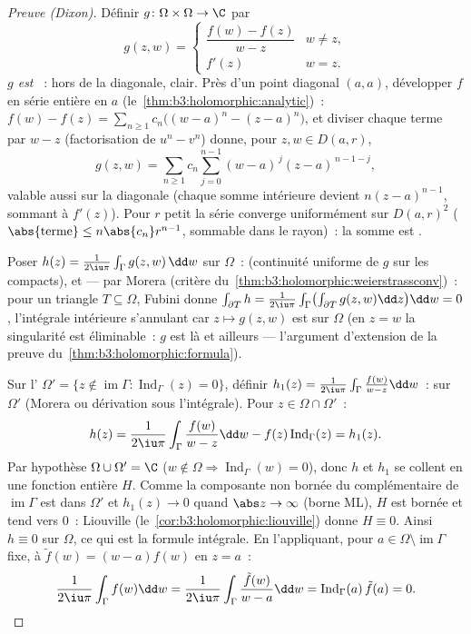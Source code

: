 \begin{proof}[Preuve (Dixon)]
Définir $g \colon \Omega\times\Omega \to \C$ par
\[
g(z, w) = \begin{cases}
\dfrac{f(w) - f(z)}{w - z} & w \neq z,\\[4pt]
f'(z) & w = z .
\end{cases}
\]
\emph{$g$ est }~: hors de la diagonale, clair. Près
d'un point diagonal $(a, a)$, développer $f$ en série entière
en $a$ (le~\cref{thm:b3:holomorphic:analytic})~: $f(w) - f(z)
= \sum_{n\geq1}c_n\bigl((w-a)^n - (z-a)^n\bigr)$, et diviser
chaque terme par $w - z$ (factorisation de $u^n - v^n$) donne,
pour $z, w \in D(a, r)$,
\[
g(z, w) =
\sum_{n\geq1}c_n\sum_{j=0}^{n-1}(w-a)^{\,j}(z-a)^{\,n-1-j},
\]
valable aussi sur la diagonale (chaque somme intérieure
devient $n(z-a)^{n-1}$, sommant à $f'(z)$). Pour $r$ petit la
série converge uniformément sur $D(a,r)^2$
($\abs{\text{terme}} \leq n\abs{c_n}r^{n-1}$, sommable dans
le rayon)~: la somme est .

Poser $h(z) = \frac1{2\iu\pi}\int_\Gamma g(z, w)\,\dd w$ sur
$\Omega$~:  (continuité uniforme de $g$ sur les
compacts), et  --- par Morera (critère
du~\cref{thm:b3:holomorphic:weierstrassconv})~: pour un
triangle $T \subseteq \Omega$, Fubini donne $\int_{\partial
T}h = \frac1{2\iu\pi}\int_\Gamma\bigl(\int_{\partial T}g(z,
w)\dd z\bigr)\dd w = 0$, l'intégrale intérieure s'annulant
car $z \mapsto g(z, w)$ est  sur $\Omega$ (en $z =
w$ la singularité est éliminable~: $g$ est  là et
 ailleurs --- l'argument d'extension de la preuve
du~\cref{thm:b3:holomorphic:formula}).

Sur l' $\Omega' = \{z \notin \operatorname{im}\Gamma
: \operatorname{Ind}_\Gamma(z) = 0\}$, définir $h_1(z) =
\frac1{2\iu\pi}\int_\Gamma\frac{f(w)}{w - z}\dd w$~:
 sur $\Omega'$ (Morera ou dérivation sous
l'intégrale). Pour $z \in \Omega\cap\Omega'$~:
\[
h(z) = \frac1{2\iu\pi}\int_\Gamma\frac{f(w)}{w-z}\dd w
- f(z)\operatorname{Ind}_\Gamma(z) = h_1(z) .
\]
Par hypothèse $\Omega\cup\Omega' = \C$ ($w \notin \Omega
\Rightarrow \operatorname{Ind}_\Gamma(w) = 0$), donc $h$ et
$h_1$ se collent en une fonction entière $H$. Comme la
composante non bornée du complémentaire de
$\operatorname{im}\Gamma$ est dans $\Omega'$ et $h_1(z) \to
0$ quand $\abs z \to \infty$ (borne ML), $H$ est bornée et
tend vers $0$~: Liouville (le~\cref{cor:b3:holomorphic:liouville})
donne $H \equiv 0$. Ainsi $h \equiv 0$ sur $\Omega$, ce qui
est la formule intégrale. En l'appliquant, pour $a \in
\Omega\setminus\operatorname{im}\Gamma$ fixe, à $\tilde f(w)
= (w - a)f(w)$ en $z = a$~:
\[
\frac1{2\iu\pi}\int_\Gamma f(w)\dd w =
\frac1{2\iu\pi}\int_\Gamma \frac{\tilde f(w)}{w - a}\dd w =
\operatorname{Ind}_\Gamma(a)\,\tilde f(a) = 0 .
\]
\end{proof}


